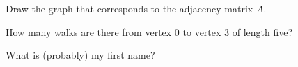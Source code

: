 \documentclass[exam, 12pt]{wvwcdocs}
\begin{document}
\begin{questions}
\begin{parts}
              \qpart\label{part:graph-drawing}
              Draw the graph that corresponds to the adjacency matrix \( A \).


              \qpart\label{part:walks}
              How many walks are there from vertex \( 0 \) to vertex \( 3 \) of length five?


          \end{parts}

          \bonusquestion[5] What is (probably) my first name?



\end{questions}
\end{document}
